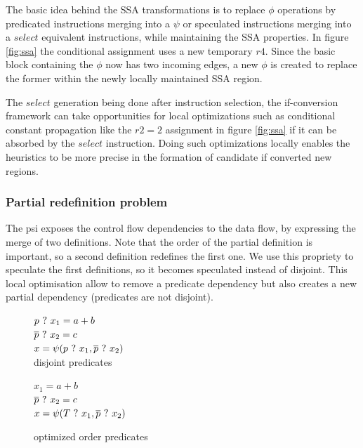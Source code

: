 The basic idea behind the SSA transformations is to replace $\phi$ operations by predicated instructions merging into a $\psi$ or speculated instructions merging into a $select$ equivalent instructions, while maintaining the SSA properties. In figure \ref{fig:ssa} the conditional assignment uses a new temporary $r4$. Since the basic block containing the $\phi$ now has two incoming edges, a new $\phi$ is created to replace the former within the newly locally maintained SSA region.

The $select$ generation being done after instruction selection, the if-conversion framework can take opportunities for local optimizations such as conditional constant propagation like the $r2=2$ assignment in figure \ref{fig:ssa} if it can be absorbed by the $select$ instruction. Doing such optimizations locally enables the heuristics to be more precise in the formation of candidate if converted new regions.

\subsubsection{Partial redefinition problem}

The psi exposes the control flow dependencies to the data flow, by expressing the merge of two definitions. Note that the order of the partial definition is important, so a second definition redefines the first one. We use this propriety to speculate the first definitions, so it becomes speculated instead of disjoint. This local optimisation allow to remove a predicate dependency but also creates a new partial dependency (predicates are not disjoint).

\begin{figure}
\footnotesize
\begin{minipage}{6cm}
$ p ~?~ x_1 = a + b $ \\
$ \overline{p} ~?~ x_2 = c $ \\
$ x = \psi(p ~?~ x_1, \overline{p} ~?~ x_2) $ \\
\caption{disjoint predicates}
\end{minipage}
\begin{minipage}{6cm}
$ x_1 = a + b $ \\
$ \overline{p} ~?~ x_2 = c $ \\
$ x = \psi(T ~?~ x_1, \overline{p} ~?~ x_2) $ \\
\caption{optimized order predicates}
\end{minipage}
\end{figure}

